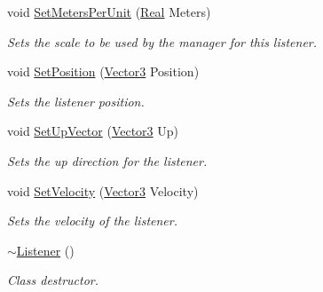 \begin{DoxyCompactItemize}
void \hyperlink{classMezzanine_1_1Audio_1_1Listener_ab413b3d85270ff5ff816b4cc5c23554e}{SetMetersPerUnit} (\hyperlink{namespaceMezzanine_a726731b1a7df72bf3583e4a97282c6f6}{Real} Meters)
\begin{DoxyCompactList}\small\item\em Sets the scale to be used by the manager for this listener. \item\end{DoxyCompactList}\item 
void \hyperlink{classMezzanine_1_1Audio_1_1Listener_a88176e6cc43ba46337f445a58d1985a9}{SetPosition} (\hyperlink{classMezzanine_1_1Vector3}{Vector3} Position)
\begin{DoxyCompactList}\small\item\em Sets the listener position. \item\end{DoxyCompactList}\item 
void \hyperlink{classMezzanine_1_1Audio_1_1Listener_a0164474c3a9e10be3b040314e257bbc8}{SetUpVector} (\hyperlink{classMezzanine_1_1Vector3}{Vector3} Up)
\begin{DoxyCompactList}\small\item\em Sets the up direction for the listener. \item\end{DoxyCompactList}\item 
void \hyperlink{classMezzanine_1_1Audio_1_1Listener_abe15a6e98f8d04ecc82af40264a63170}{SetVelocity} (\hyperlink{classMezzanine_1_1Vector3}{Vector3} Velocity)
\begin{DoxyCompactList}\small\item\em Sets the velocity of the listener. \item\end{DoxyCompactList}\item 
\hypertarget{classMezzanine_1_1Audio_1_1Listener_a443af89e23007cb1c96acb1fe297ff9c}{
\hyperlink{classMezzanine_1_1Audio_1_1Listener_a443af89e23007cb1c96acb1fe297ff9c}{$\sim$Listener} ()}
\label{classMezzanine_1_1Audio_1_1Listener_a443af89e23007cb1c96acb1fe297ff9c}

\begin{DoxyCompactList}\small\item\em Class destructor. \item\end{DoxyCompactList}\end{DoxyCompactItemize}
